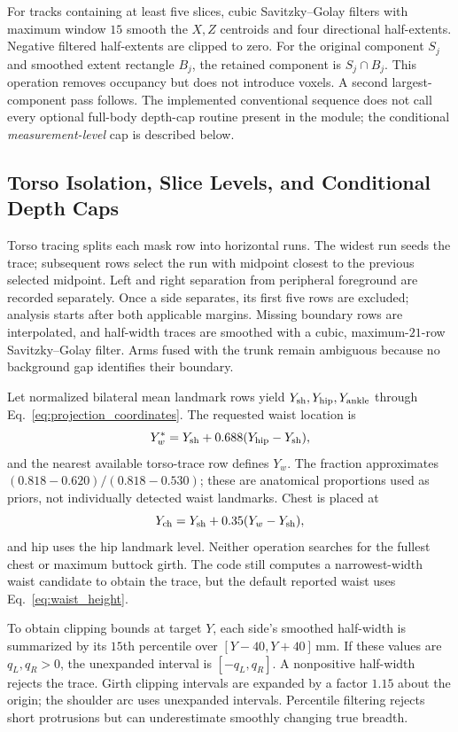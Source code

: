 For tracks containing at least five slices, cubic Savitzky--Golay filters with maximum window $15$ smooth the $X,Z$ centroids and four directional half-extents. Negative filtered half-extents are clipped to zero. For the original component $S_j$ and smoothed extent rectangle $B_j$, the retained component is $S_j\cap B_j$. This operation removes occupancy but does not introduce voxels. A second largest-component pass follows. The implemented conventional sequence does not call every optional full-body depth-cap routine present in the module; the conditional \emph{measurement-level} cap is described below.

\subsection{Torso Isolation, Slice Levels, and Conditional Depth Caps}
\label{subsec:anatomical_levels}
Torso tracing splits each mask row into horizontal runs. The widest run seeds the trace; subsequent rows select the run with midpoint closest to the previous selected midpoint. Left and right separation from peripheral foreground are recorded separately. Once a side separates, its first five rows are excluded; analysis starts after both applicable margins. Missing boundary rows are interpolated, and half-width traces are smoothed with a cubic, maximum-$21$-row Savitzky--Golay filter. Arms fused with the trunk remain ambiguous because no background gap identifies their boundary.

Let normalized bilateral mean landmark rows yield $Y_{\rm sh},Y_{\rm hip},Y_{\rm ankle}$ through Eq.~\eqref{eq:projection_coordinates}. The requested waist location is
\begin{equation}
Y_w^*=Y_{\rm sh}+0.688(Y_{\rm hip}-Y_{\rm sh}),
\label{eq:waist_height}
\end{equation}
and the nearest available torso-trace row defines $Y_w$. The fraction approximates $(0.818-0.620)/(0.818-0.530)$; these are anatomical proportions used as priors, not individually detected waist landmarks. Chest is placed at
\begin{equation}
Y_{\rm ch}=Y_{\rm sh}+0.35(Y_w-Y_{\rm sh}),
\label{eq:chest_height}
\end{equation}
and hip uses the hip landmark level. Neither operation searches for the fullest chest or maximum buttock girth. The code still computes a narrowest-width waist candidate to obtain the trace, but the default reported waist uses Eq.~\eqref{eq:waist_height}.

To obtain clipping bounds at target $Y$, each side's smoothed half-width is summarized by its $15$th percentile over $[Y-40,Y+40]$\,mm. If these values are $q_L,q_R>0$, the unexpanded interval is $[-q_L,q_R]$. A nonpositive half-width rejects the trace. Girth clipping intervals are expanded by a factor $1.15$ about the origin; the shoulder arc uses unexpanded intervals. Percentile filtering rejects short protrusions but can underestimate smoothly changing true breadth.

